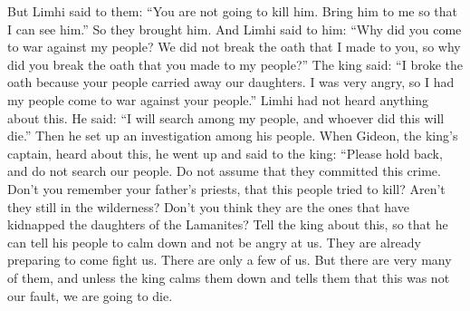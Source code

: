 But Limhi said to them: ``You are not going to kill him. Bring him to me so that I can see him.'' So they brought him. And Limhi said to him: ``Why did you come to war against my people? We did not break the oath that I made to you, so why did you break the oath that you made to my people?''
\bverse \iffalse And now the king said: I have broken the oath because thy people did carry away the daughters of my people; therefore, in my anger I did cause my people to come up to war against thy people. \fi
The king said: ``I broke the oath because your people carried away our daughters. I was very angry, so I had my people come to war against your people.''
\bverse \iffalse And now Limhi had heard nothing concerning this matter; therefore he said: I will search among my people and whosoever has done this thing shall perish. Therefore he caused a search to be made among his people. \fi
Limhi had not heard anything about this. He said: ``I will search among my people, and whoever did this will die.'' Then he set up an investigation among his people.
\bverse \iffalse Now when Gideon had heard these things, he being the king's captain, he went forth and said unto the king: I pray thee forbear, and do not search this people, and lay not this thing to their charge. \fi
When Gideon, the king's captain, heard about this, he went up and said to the king: ``Please hold back, and do not search our people. Do not assume that they committed this crime.
\bverse \iffalse For do ye not remember the priests of thy father, whom this people sought to destroy? And are they not in the wilderness?  And are not they the ones who have stolen the daughters of the Lamanites? \fi
Don't you remember your father's priests, that this people tried to kill? Aren't they still in the wilderness? Don't you think they are the ones that have kidnapped the daughters of the Lamanites?
\bverse \iffalse And now, behold, and tell the king of these things, that he may tell his people that they may be pacified towards us; for behold they are already preparing to come against us; and behold also there are but few of us. \fi
Tell the king about this, so that he can tell his people to calm down and not be angry at us. They are already preparing to come fight us. There are only a few of us.
\bverse \iffalse And behold, they come with their numerous hosts; and except the king doth pacify them towards us we must perish. \fi
But there are very many of them, and unless the king calms them down and tells them that this was not our fault, we are going to die.
